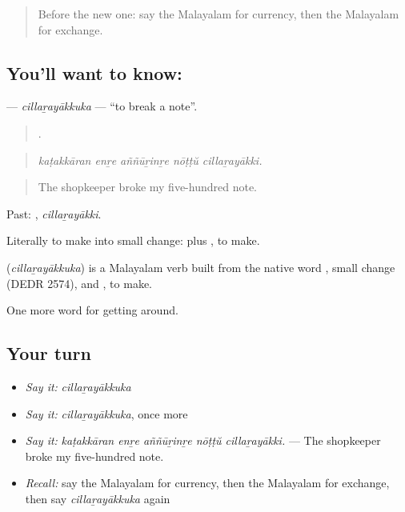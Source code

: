 \label{lesson:ML-C489-cillarayakkuka}



\begin{quote}
Before the new one: say the Malayalam for currency, then the Malayalam for exchange.
\end{quote}

\subsection*{You'll want to know: }
\textbf{} — \emph{cillaṟayākkuka} — \textquotedblleft{}to break a note\textquotedblright{}.

\begin{quote}
    .
\end{quote}

\begin{quote}
\emph{kaṭakkāran enṟe aññūṟinṟe nōṭṭŭ cillaṟayākki.}
\end{quote}

\begin{quote}
The shopkeeper broke my five-hundred note.
\end{quote}

Past: , \emph{cillaṟayākki}.

Literally to make into small change:  plus , to make.

\begin{cousinweb}
\textbf{} (\emph{cillaṟayākkuka}) is a Malayalam verb built from the native word , small change (DEDR 2574), and , to make.
\end{cousinweb}

\begin{grammarlens}[title={What you've built}]
One more word for getting around.
\end{grammarlens}

\subsection*{Your turn}
\begin{itemize}
\raggedright
  \item \emph{Say it:} \emph{cillaṟayākkuka}
  \item \emph{Say it:} \emph{cillaṟayākkuka}, once more
  \item \emph{Say it:} \emph{kaṭakkāran enṟe aññūṟinṟe nōṭṭŭ cillaṟayākki.} — The shopkeeper broke my five-hundred note.
  \item \emph{Recall:} say the Malayalam for currency, then the Malayalam for exchange, then say \emph{cillaṟayākkuka} again
\end{itemize}

